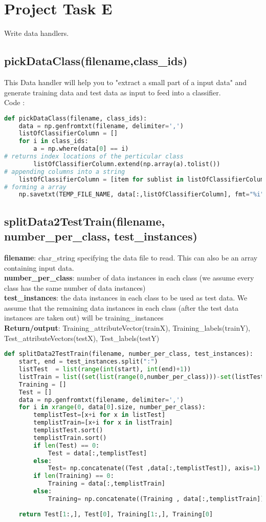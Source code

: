 \documentclass[a4paper]{article}
\begin{document}
\section{ Project Task E}
Write data handlers.
\subsection{pickDataClass(filename,class\_ids)}
This Data handler will help you to "extract a small part of a input data" and generate training data and test data as input to feed into a classifier.
\\Code :
\begin{lstlisting}[language=Python]
def pickDataClass(filename, class_ids):
    data = np.genfromtxt(filename, delimiter=',')
    listOfClassifierColumn = []
    for i in class_ids:
        a = np.where(data[0] == i) 
# returns index locations of the perticular class
        listOfClassifierColumn.extend(np.array(a).tolist()) 
# appending columns into a string 
    listOfClassifierColumn = [item for sublist in listOfClassifierColumn for item in sublist] 
# forming a array    
    np.savetxt(TEMP_FILE_NAME, data[:,listOfClassifierColumn], fmt="%i", delimiter=',')
\end{lstlisting}
\subsection {splitData2TestTrain(filename, number\_per\_class,  test\_instances)}
\textbf{filename}: char\_string specifying the data file to read. This can also be an array containing input data.
\\\textbf{number\_per\_class}: number of data instances in each class (we assume every class has the same number of data instances)
\\\textbf{test\_instances}: the data instances in each class to be used as test data. We assume that the remaining data instances in each class (after the test data instances are taken out) will be training\_instances  
\\\textbf{Return/output}: Training\_attributeVector(trainX), Training\_labels(trainY),  \\ Test\_attributeVectors(testX), Test\_labels(testY)
\begin{lstlisting}[language=Python]
def splitData2TestTrain(filename, number_per_class, test_instances):
    start, end = test_instances.split(":")
    listTest  = list(range(int(start), int(end)+1))
    listTrain = list((set(list(range(0,number_per_class)))-set(listTest)))
    Training = []
    Test = []
    data = np.genfromtxt(filename, delimiter=',')    
    for i in xrange(0, data[0].size, number_per_class):
        templistTest=[x+i for x in listTest]
        templistTrain=[x+i for x in listTrain]
        templistTest.sort()
        templistTrain.sort()
        if len(Test) == 0:
            Test = data[:,templistTest]
        else:
            Test= np.concatenate((Test ,data[:,templistTest]), axis=1)
        if len(Training) == 0:
            Training = data[:,templistTrain]
        else:
            Training= np.concatenate((Training , data[:,templistTrain]), axis=1)
    
    return Test[1:,], Test[0], Training[1:,], Training[0]
\end{lstlisting}
\end{document}

